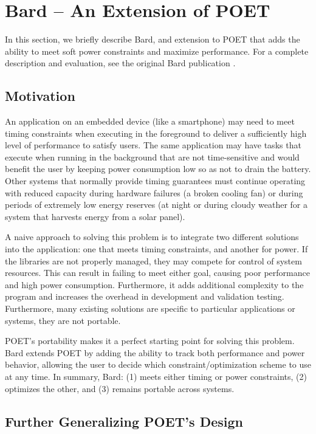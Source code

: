 \section{Bard -- An Extension of POET}
\label{sec:poet-bard}

In this section, we briefly describe Bard, and extension to POET that adds the ability to meet soft power constraints and maximize performance.
For a complete description and evaluation, see the original Bard publication \cite{Bard}.


\subsection{Motivation}

An application on an embedded device (like a smartphone) may need to meet timing constraints when executing in the foreground to deliver a sufficiently high level of performance to satisfy users.
The same application may have tasks that execute when running in the background that are not time-sensitive and would benefit the user by keeping power consumption low so as not to drain the battery.
Other systems that normally provide timing guarantees must continue operating with reduced capacity during hardware failures (\eg a broken cooling fan) or during periods of extremely low energy reserves (\eg at night or during cloudy weather for a system that harvests energy from a solar panel).

A naive approach to solving this problem is to integrate two different solutions into the application: one that meets timing constraints, and another for power.
If the libraries are not properly managed, they may compete for control of system resources.
This can result in failing to meet either goal, causing poor performance and high power consumption.
Furthermore, it adds additional complexity to the program and increases the overhead in development and validation testing.
Furthermore, many existing solutions are specific to particular applications or systems, \ie they are not portable.

POET's portability makes it a perfect starting point for solving this problem.
Bard extends POET by adding the ability to track both performance and power behavior, allowing the user to decide which constraint/optimization scheme to use at any time.
In summary, Bard: (1) meets either timing or power constraints, (2) optimizes the other, and (3) remains portable across systems.


\subsection{Further Generalizing POET's Design}

